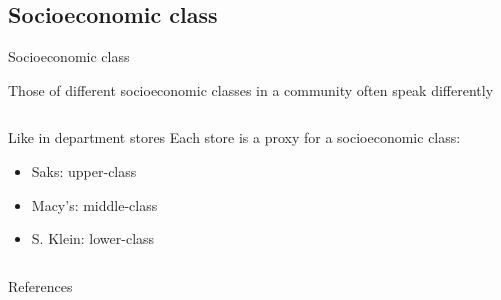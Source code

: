 \documentclass{beamer}
\newcommand{\subonetwo}{Socioeconomic class}
\begin{document}
    \subsection{\subonetwo}
      \begin{frame}{\subonetwo}
        \begin{block}{}
          Those of different socioeconomic classes in a community often speak differently
        \end{block}
        \begin{columns}
            \begin{block}{Like in department stores} %
              Each store is a proxy for a socioeconomic class:
              \begin{itemize}
                \item Saks: upper-class
                \item Macy's: middle-class
                \item S. Klein: lower-class
              \end{itemize}
            \end{block}
        \end{columns}
      \end{frame}

      \begin{frame}{References}
      \end{frame}
\end{document}
